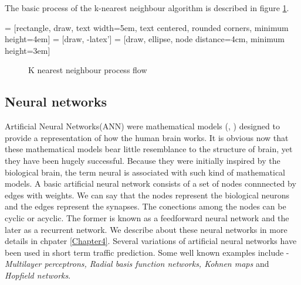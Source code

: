 The basic process of the k-nearest neighbour algorithm is described in figure \ref{fig:KnnProcessFlow}.


 = [rectangle, draw, text width=5em, text centered, rounded corners,
minimum height=4em]
 = [draw, -latex']
 = [draw, ellipse, node distance=4cm, minimum height=3em]

\begin{figure}
\centering
{}
\caption{K nearest neighbour process flow} \label{fig:KnnProcessFlow}
\end{figure}

\citet{lv2009real}

\citet{myung2011travel}

\citet{zhang2013improved}

\citet{meng2015two}


\subsection{Neural networks}
\label{subsec:neuralNetworksTrafficPred}
Artificial Neural Networks(ANN) were mathematical models (\citet{mcculloch1943logical},
\citet{rosenblatt1958perceptron}) designed to  provide a representation of how the human brain
works. It is obvious now that these mathematical models bear little resemblance to the structure
of brain, yet they have been hugely successful. Because they were initially inspired by the
biological brain, the term neural is associated with such kind of mathematical models. A basic
artificial neural network consists of a set of nodes connnected by edges with weights. We can say
that the nodes represent the biological neurons and the edges represent the synapses. The
conections among the nodes can be cyclic or acyclic. The former is known as a feedforward neural
network and the later as a recurrent network. We describe about these neural networks in more
details in chpater \ref{Chapter4}. Several variations of artificial neural networks have been
used in short term traffic prediction. Some well known examples include - \textit{Multilayer
perceptrons, Radial basis function networks, Kohnen maps} and \textit{Hopfield networks}.


